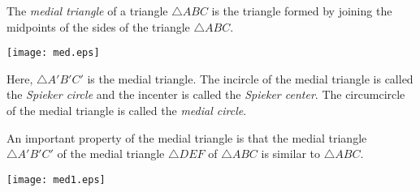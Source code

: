 \documentclass[12pt]{article}
\begin{document}

The \emph{medial triangle} of a triangle $\triangle ABC$ is the triangle formed by joining the midpoints of the sides of the triangle $\triangle ABC.$

\begin{center}
\texttt{[image: med.eps]}
\end{center}

Here, $\triangle A'B'C'$ is the medial triangle.
The incircle of the medial triangle is called the \emph{Spieker circle} and the incenter is called the \emph{Spieker center}.
The circumcircle of the medial triangle is called the \emph{medial circle}.

An important property of the medial triangle is that the medial triangle $\triangle A'B'C'$ of the medial triangle $\triangle DEF$ of  $\triangle ABC$ is similar to  $\triangle ABC.$

\begin{center}
\texttt{[image: med1.eps]}
\end{center}
\end{document}
